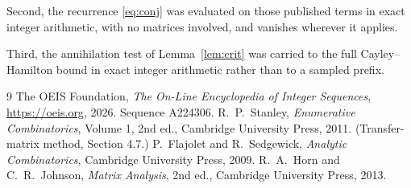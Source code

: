 \documentclass[11pt,a4paper]{article}
\theoremstyle{plain}
\theoremstyle{definition}
\begin{document}
Second, the recurrence \eqref{eq:conj} was evaluated on those published terms in exact
integer arithmetic, with no matrices involved, and vanishes wherever it applies.

Third, the annihilation test of Lemma~\ref{lem:crit} was carried to the full
Cayley--Hamilton bound in exact integer arithmetic rather than to a sampled prefix.

\begin{thebibliography}{9}
 The OEIS Foundation, \emph{The On-Line Encyclopedia of Integer
Sequences}, \url{https://oeis.org}, 2026. Sequence A224306.
 R.~P.~Stanley, \emph{Enumerative Combinatorics}, Volume 1, 2nd ed.,
Cambridge University Press, 2011. (Transfer-matrix method, Section 4.7.)
 P.~Flajolet and R.~Sedgewick, \emph{Analytic Combinatorics}, Cambridge
University Press, 2009.
 R.~A.~Horn and C.~R.~Johnson, \emph{Matrix Analysis}, 2nd ed., Cambridge
University Press, 2013.
\end{thebibliography}
\end{document}
